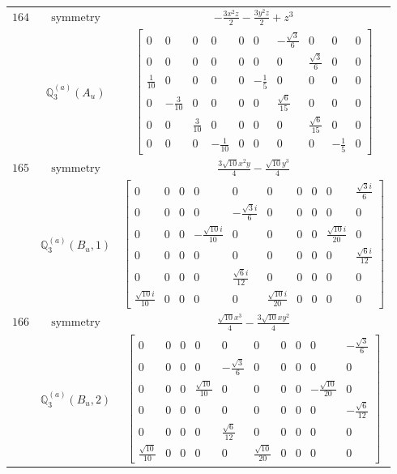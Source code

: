\documentclass[fleqn,8pt,landscape]{jsarticle}
\begin{document}
\begin{longtable}{ccc}
$ 164 $ & $ \text{symmetry} $ & $ - \frac{3 x^{2} z}{2} - \frac{3 y^{2} z}{2} + z^{3} $ \\
$  $ & $ \mathbb{Q}_{3}^{(a)}(A_{u}) $ & $ \begin{bmatrix} 0 & 0 & 0 & 0 & 0 & 0 & - \frac{\sqrt{3}}{6} & 0 & 0 & 0 \\ 0 & 0 & 0 & 0 & 0 & 0 & 0 & \frac{\sqrt{3}}{6} & 0 & 0 \\ \frac{1}{10} & 0 & 0 & 0 & 0 & - \frac{1}{5} & 0 & 0 & 0 & 0 \\ 0 & - \frac{3}{10} & 0 & 0 & 0 & 0 & \frac{\sqrt{6}}{15} & 0 & 0 & 0 \\ 0 & 0 & \frac{3}{10} & 0 & 0 & 0 & 0 & \frac{\sqrt{6}}{15} & 0 & 0 \\ 0 & 0 & 0 & - \frac{1}{10} & 0 & 0 & 0 & 0 & - \frac{1}{5} & 0 \end{bmatrix} $ \\ \hline
$ 165 $ & $ \text{symmetry} $ & $ \frac{3 \sqrt{10} x^{2} y}{4} - \frac{\sqrt{10} y^{3}}{4} $ \\
$  $ & $ \mathbb{Q}_{3}^{(a)}(B_{u},1) $ & $ \begin{bmatrix} 0 & 0 & 0 & 0 & 0 & 0 & 0 & 0 & 0 & \frac{\sqrt{3} i}{6} \\ 0 & 0 & 0 & 0 & - \frac{\sqrt{3} i}{6} & 0 & 0 & 0 & 0 & 0 \\ 0 & 0 & 0 & - \frac{\sqrt{10} i}{10} & 0 & 0 & 0 & 0 & \frac{\sqrt{10} i}{20} & 0 \\ 0 & 0 & 0 & 0 & 0 & 0 & 0 & 0 & 0 & \frac{\sqrt{6} i}{12} \\ 0 & 0 & 0 & 0 & \frac{\sqrt{6} i}{12} & 0 & 0 & 0 & 0 & 0 \\ \frac{\sqrt{10} i}{10} & 0 & 0 & 0 & 0 & \frac{\sqrt{10} i}{20} & 0 & 0 & 0 & 0 \end{bmatrix} $ \\ \hline
$ 166 $ & $ \text{symmetry} $ & $ \frac{\sqrt{10} x^{3}}{4} - \frac{3 \sqrt{10} x y^{2}}{4} $ \\
$  $ & $ \mathbb{Q}_{3}^{(a)}(B_{u},2) $ & $ \begin{bmatrix} 0 & 0 & 0 & 0 & 0 & 0 & 0 & 0 & 0 & - \frac{\sqrt{3}}{6} \\ 0 & 0 & 0 & 0 & - \frac{\sqrt{3}}{6} & 0 & 0 & 0 & 0 & 0 \\ 0 & 0 & 0 & \frac{\sqrt{10}}{10} & 0 & 0 & 0 & 0 & - \frac{\sqrt{10}}{20} & 0 \\ 0 & 0 & 0 & 0 & 0 & 0 & 0 & 0 & 0 & - \frac{\sqrt{6}}{12} \\ 0 & 0 & 0 & 0 & \frac{\sqrt{6}}{12} & 0 & 0 & 0 & 0 & 0 \\ \frac{\sqrt{10}}{10} & 0 & 0 & 0 & 0 & \frac{\sqrt{10}}{20} & 0 & 0 & 0 & 0 \end{bmatrix} $ \\ \hline

\end{longtable}
\end{document}
